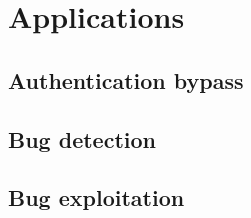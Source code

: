 
\section{Applications}

\subsection{Authentication bypass}
\cite{FIRMALICE-NDSS15}

\subsection{Bug detection}
\cite{DRILLER-NDSS16}

\subsection{Bug exploitation}
\cite{MAYHEM-SP12}